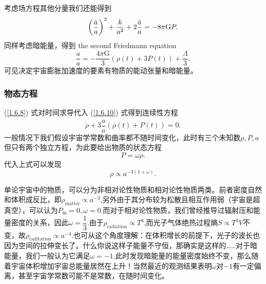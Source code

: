 \documentclass[../天体物理基础.tex]{subfiles}
\begin{document}
考虑场方程其他分量我们还能得到
\begin{equation}
\left(\frac{\dot{a}}{a}\right)^{2}+\frac{k}{a^{2}}+2\frac{\ddot{a}}{a}=-8\pi\mathrm{G}P.\\
\end{equation}
同样考虑暗能量，得到 the second Friedmann equation
\begin{equation}
\frac{\ddot{a}}{a}=-\frac{4\pi\mathrm{G}}{3}\left(\rho\left(t\right)+3P\left(t\right)\right)+\frac{\Lambda}{3}.\label{1.6.10}
\end{equation}
可见决定宇宙膨胀加速度的要素有物质的能动张量和暗能量。

\subsubsection{物态方程}
(\ref{1.6.8}) 式对时间求导代入 (\ref{1.6.10}) 式得到连续性方程
\begin{equation}
\dot{\rho}+3\frac{\dot{a}}{a}\left(\rho\left(t\right)+P\left(t\right)\right)=0.
\end{equation}
一般情况下我们假设宇宙学常数和曲率都不随时间变化，此时有三个未知数$\rho,P,a$但只有两个独立方程，为此要给出物质的状态方程
\begin{equation}
P=\omega\rho.
\end{equation}
代入上式可以发现
\begin{equation}
\rho\propto{}a^{-3\left(1+\omega\right)}.
\end{equation}

单论宇宙中的物质，可以分为非相对论性物质和相对论性物质两类。前者密度自然和体积成反比，即$\rho_{\text{matter}}\propto a^{-3}$,另外由于其分布较为松散且相互作用弱（宇宙是超真空），可以认为$P_{\text{m}}=0,\omega=0$.而对于相对论性物质，我们曾经推导过辐射压和能量密度的关系，因此$\omega=\dfrac{1}{3}$.由于$\rho_{\text{radiation}}\propto{}T^{4}$,而光子气体绝热过程熵$S\propto{}T^{3}V$不变，故$\rho_{\text{raditation}}\propto{}a^{-4}$.也可从这个角度理解：在体积增长的前提下，光子的波长也因为空间的拉伸变长了。什么你说这样子能量不守恒，那确实是这样的……对于暗能量，我们一般认为它满足$\omega=-1$.此时发现暗能量的能量密度始终不变，那么随着宇宙体积增加宇宙总能量居然在上升！当然最近的观测结果表明$\omega$对$-1$有一定偏离，甚至宇宙学常数可能不是常数，在随时间变化。
\end{document}
